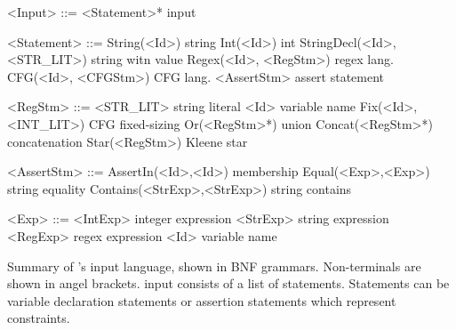 \begin{Grammar}
    \setlength{\grammarindent}{5em} %
    \begin{grammar}
        <Input> ::= <Statement>*                    \hfill \imss input

        <Statement> ::= String(<Id>)                \hfill string
                \alt Int(<Id>)                      \hfill int
                \alt StringDecl(<Id>, <STR_LIT>)    \hfill string witn value
                \alt Regex(<Id>, <RegStm>)          \hfill regex lang.
                \alt CFG(<Id>, <CFGStm>)            \hfill CFG lang.
                \alt <AssertStm>                    \hfill assert statement

        <RegStm> ::= <STR_LIT>                      \hfill string literal
                \alt <Id>                           \hfill variable name
                \alt Fix(<Id>, <INT_LIT>)           \hfill CFG fixed-sizing
                \alt Or(<RegStm>*)                  \hfill union
                \alt Concat(<RegStm>*)              \hfill concatenation
                \alt Star(<RegStm>)                 \hfill Kleene star

        <AssertStm> ::= AssertIn(<Id>,<Id>)         \hfill membership
                \alt Equal(<Exp>,<Exp>)             \hfill string equality
                \alt Contains(<StrExp>,<StrExp>)    \hfill string contains

        <Exp> ::= <IntExp>                          \hfill integer expression
                \alt <StrExp>                       \hfill string expression
                \alt <RegExp>                       \hfill regex expression
                \alt <Id>                           \hfill variable name

    \end{grammar}
 \caption{\label{fig:grammar}Summary of \imss's input language, shown in BNF grammars.
 Non-terminals are shown in angel brackets. \imss input consists of a list of statements.
 Statements can be variable declaration statements or assertion statements which represent
 constraints.}
 \end{Grammar}

